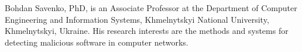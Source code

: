 \documentclass{ieeeijc}
\theoremstyle{remark}
\begin{document}
\vspace{1.0\baselineskip}

\noindent
{}
{Bohdan Savenko, PhD, is an Associate Professor at the Department of Computer Engineering and Information Systems, Khmelnytskyi National University, Khmelnytskyi, Ukraine.}
{His research interests are the methods and systems for detecting malicious software in computer networks.}

\EOD
\end{document}
